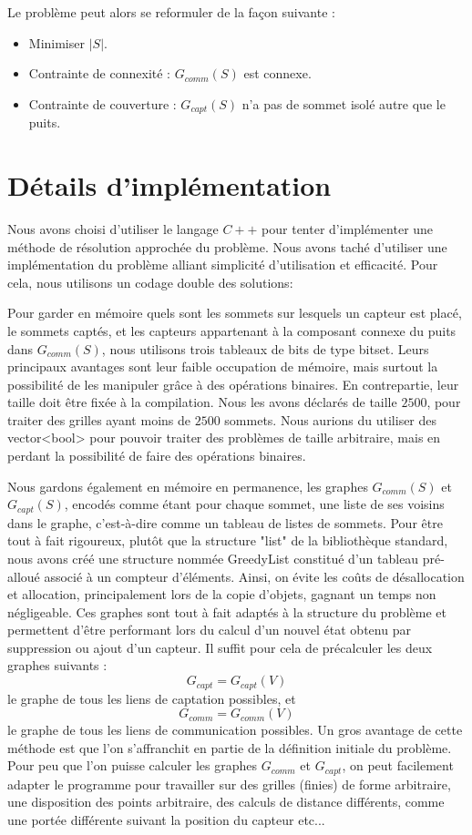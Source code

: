 \documentclass[12pt,a4paper]{article}
\begin{document}
Le problème peut alors se reformuler de la façon suivante :
\begin{itemize}
\item Minimiser $|S|$.
\item Contrainte de connexité : $G_{comm}(S)$ est connexe.
\item Contrainte de couverture : $G_{capt}(S)$ n'a pas de sommet isolé autre que le puits.
\end{itemize}
\section{Détails d'implémentation}
Nous avons choisi d'utiliser le langage $C++$ pour tenter d'implémenter une méthode de résolution approchée du problème. Nous avons taché d'utiliser une implémentation du problème alliant simplicité d'utilisation et efficacité. Pour cela, nous utilisons un codage double des solutions:

Pour garder en mémoire quels sont les sommets sur lesquels un capteur est placé, le sommets captés, et les capteurs appartenant à la composant connexe du puits dans $G_{comm}(S)$, nous utilisons trois tableaux de bits de type bitset. Leurs principaux avantages sont leur faible occupation de mémoire, mais surtout la possibilité de les manipuler grâce à des opérations binaires. En contrepartie, leur taille doit être fixée à la compilation. Nous les avons déclarés de taille $2500$, pour traiter des grilles ayant moins de $2500$ sommets. Nous aurions du utiliser des vector<bool> pour pouvoir traiter des problèmes de taille arbitraire, mais en perdant la possibilité de faire des opérations binaires.

Nous gardons également en mémoire en permanence, les graphes $G_{comm}(S)$ et $G_{capt}(S)$, encodés comme étant pour chaque sommet, une liste de ses voisins dans le graphe, c'est-à-dire comme un tableau de listes de sommets. Pour être tout à fait rigoureux, plutôt que la structure "list" de la bibliothèque standard, nous avons créé une structure nommée GreedyList constitué d'un tableau pré-alloué associé à un compteur d'éléments. Ainsi, on évite les coûts de désallocation et allocation, principalement lors de la copie d'objets, gagnant un temps non négligeable. Ces graphes sont tout à fait  adaptés à la structure du problème et permettent d'être performant lors du calcul d'un nouvel état obtenu par suppression ou ajout d'un capteur. Il suffit pour cela de précalculer les deux graphes suivants : 
\[G_{capt}=G_{capt}(V)\]
 le graphe de tous les liens de captation possibles, et
\[G_{comm}=G_{comm}(V)\] 
le graphe de tous les liens de communication possibles. Un gros avantage de cette méthode est que l'on s'affranchit en partie de la définition initiale du problème. Pour peu que l'on puisse calculer les graphes $G_{comm}$ et $G_{capt}$, on peut facilement adapter le programme pour travailler sur des grilles (finies) de forme arbitraire, une disposition des points arbitraire, des calculs de distance différents, comme une portée différente suivant la position du capteur etc...
\end{document}
